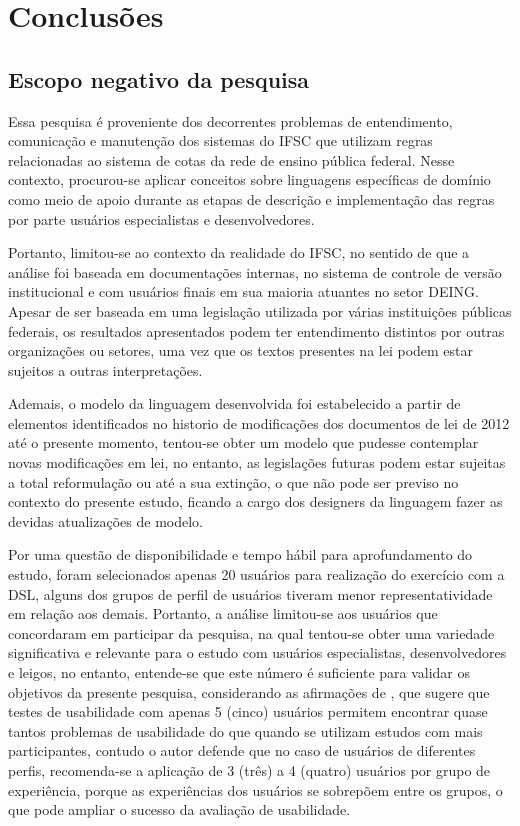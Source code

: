 \chapter{Conclusões}
\label{chap:consideracoes}



\section{Escopo negativo da pesquisa}
\label{escoponegativo}

Essa pesquisa é proveniente dos decorrentes problemas de entendimento, comunicação e manutenção dos sistemas do \gls{IFSC} que utilizam regras relacionadas ao sistema de cotas da rede de ensino pública federal. Nesse contexto, procurou-se aplicar conceitos sobre linguagens específicas de domínio como meio de apoio durante as etapas de descrição e implementação das regras por parte usuários especialistas e desenvolvedores. 

Portanto, limitou-se ao contexto da realidade do \gls{IFSC}, no sentido de que a análise foi baseada em documentações internas, no sistema de controle de versão institucional e com usuários finais em sua maioria atuantes no setor \gls{DEING}. Apesar de ser baseada em uma legislação utilizada por várias instituições públicas federais, os resultados apresentados podem ter entendimento distintos por outras organizações ou setores, uma vez que os textos presentes na lei podem estar sujeitos a outras interpretações. 

Ademais, o modelo da linguagem desenvolvida foi estabelecido a partir de elementos identificados no historio de modificações dos documentos de lei de 2012 até o presente momento, tentou-se obter um modelo que pudesse contemplar novas modificações em lei, no entanto, as legislações futuras podem estar sujeitas a total reformulação ou até a sua extinção, o que não pode ser previso no contexto do presente estudo, ficando a cargo dos designers da linguagem fazer as devidas atualizações de modelo.

Por uma questão de disponibilidade e tempo hábil para aprofundamento do estudo, foram selecionados apenas 20 usuários para realização do exercício com a DSL, alguns dos grupos de perfil de usuários tiveram menor representatividade em relação aos demais. Portanto, a análise limitou-se aos usuários que concordaram em participar da pesquisa, na qual tentou-se obter uma variedade significativa e relevante para o estudo com usuários especialistas, desenvolvedores e leigos, no entanto, entende-se que este número é suficiente para validar os objetivos da presente pesquisa, considerando as afirmações de , que sugere que testes de usabilidade com apenas 5 (cinco) usuários permitem encontrar quase tantos problemas de usabilidade do que quando se utilizam estudos com mais participantes, contudo o autor defende que no caso de usuários de diferentes perfis, recomenda-se a aplicação de 3 (três) a 4 (quatro) usuários por grupo de experiência, porque as experiências dos usuários se sobrepõem entre os grupos, o que pode ampliar o sucesso da avaliação de usabilidade. 

